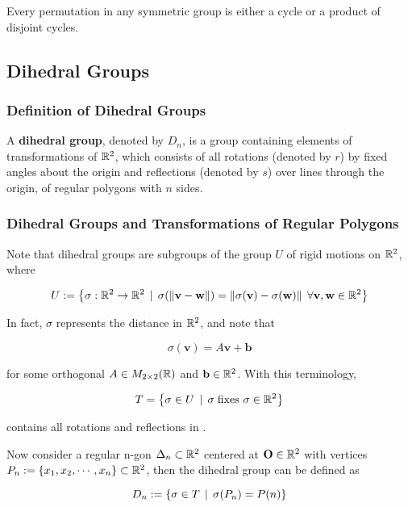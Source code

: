 \documentclass[a4paper,12pt]{article}
\begin{document}
\begin{thm}
  Every permutation in any symmetric group is either a cycle or a product of disjoint cycles.
\end{thm}

\subsection{Dihedral Groups}
\subsubsection{Definition of Dihedral Groups}
\begin{dft}
  A \textbf{dihedral group}, denoted by $D_{n}$, is a group containing elements of transformations of $\mathbb{R}^{2}$, which consists of all rotations (denoted by $r$) by fixed angles about the origin and reflections (denoted by $s$) over lines through the origin, of regular polygons with $n$ sides.
\end{dft}

\subsubsection{Dihedral Groups and Transformations of Regular Polygons}
Note that dihedral groups are subgroups of the group $U$ of rigid motions on $\mathbb{R}^{2}$, where

$$U:=\left\{ \sigma:\mathbb{R}^{2}\to\mathbb{R}^{2}\,\mid\,\sigma(\left\| \mathbf{v}-\mathbf{w}\right\|)=\left\| \sigma(\mathbf{v})-\sigma(\mathbf{w})\right\|\;\forall\mathbf{v},\mathbf{w}\in\mathbb{R}^{2}\right\}$$ %

In fact, $\sigma$ represents the distance in $\mathbb{R}^{2}$, and note that

$$\sigma(\mathbf{v})=A\mathbf{v}+\mathbf{b}$$\s

for some orthogonal $A\in M_{2\times 2}(\mathbb{R})$ and $\mathbf{b}\in\mathbb{R}^{2}$. With this terminology,

$$T=\left\{ \sigma\in U\,\mid\,\sigma\;\text{fixes }\mathrm{\sigma}\in\mathbb{R}^{2}\right\}$$\s

contains all rotations and reflections in \rdft.\n

Now consider a regular n-gon $\Delta_{n}\subset\mathbb{R}^{2}$ centered at $\mathbf{O}\in\mathbb{R}^{2}$ with vertices $P_{n}:=\left\{ x_{1},x_{2},\cdots,x_{n}\right\}\subset\mathbb{R}^{2}$, then the dihedral group can be defined as

$$D_{n}:=\left\{ \sigma\in T\,\mid\,\sigma(P_{n})=P(n)\right\}$$
\end{document}
